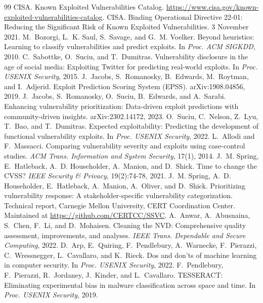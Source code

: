 \documentclass[conference,a4paper]{IEEEtran}
\begin{document}
\begin{thebibliography}{99}
 CISA. Known Exploited Vulnerabilities Catalog. \url{https://www.cisa.gov/known-exploited-vulnerabilities-catalog}.
 CISA. Binding Operational Directive 22-01: Reducing the Significant Risk of Known Exploited Vulnerabilities. 3 November 2021.
 M.~Bozorgi, L.~K. Saul, S.~Savage, and G.~M. Voelker. Beyond heuristics: Learning to classify vulnerabilities and predict exploits. In \emph{Proc. ACM SIGKDD}, 2010.
 C.~Sabottke, O.~Suciu, and T.~Dumitras. Vulnerability disclosure in the age of social media: Exploiting Twitter for predicting real-world exploits. In \emph{Proc. USENIX Security}, 2015.
 J.~Jacobs, S.~Romanosky, B.~Edwards, M.~Roytman, and I.~Adjerid. Exploit Prediction Scoring System (EPSS). arXiv:1908.04856, 2019.
 J.~Jacobs, S.~Romanosky, O.~Suciu, B.~Edwards, and A.~Sarabi. Enhancing vulnerability prioritization: Data-driven exploit predictions with community-driven insights. arXiv:2302.14172, 2023.
 O.~Suciu, C.~Nelson, Z.~Lyu, T.~Bao, and T.~Dumitras. Expected exploitability: Predicting the development of functional vulnerability exploits. In \emph{Proc. USENIX Security}, 2022.
 L.~Allodi and F.~Massacci. Comparing vulnerability severity and exploits using case-control studies. \emph{ACM Trans. Information and System Security}, 17(1), 2014.
 J.~M. Spring, E.~Hatleback, A.~D. Householder, A.~Manion, and D.~Shick. Time to change the CVSS? \emph{IEEE Security \& Privacy}, 19(2):74-78, 2021.
 J.~M. Spring, A.~D. Householder, E.~Hatleback, A.~Manion, A.~Oliver, and D.~Shick. Prioritizing vulnerability response: A stakeholder-specific vulnerability categorization. Technical report, Carnegie Mellon University, CERT Coordination Center. Maintained at \url{https://github.com/CERTCC/SSVC}.
 A.~Anwar, A.~Abusnaina, S.~Chen, F.~Li, and D.~Mohaisen. Cleaning the NVD: Comprehensive quality assessment, improvements, and analyses. \emph{IEEE Trans. Dependable and Secure Computing}, 2022.
 D.~Arp, E.~Quiring, F.~Pendlebury, A.~Warnecke, F.~Pierazzi, C.~Wressnegger, L.~Cavallaro, and K.~Rieck. Dos and don'ts of machine learning in computer security. In \emph{Proc. USENIX Security}, 2022.
 F.~Pendlebury, F.~Pierazzi, R.~Jordaney, J.~Kinder, and L.~Cavallaro. TESSERACT: Eliminating experimental bias in malware classification across space and time. In \emph{Proc. USENIX Security}, 2019.

\end{thebibliography}
\end{document}
